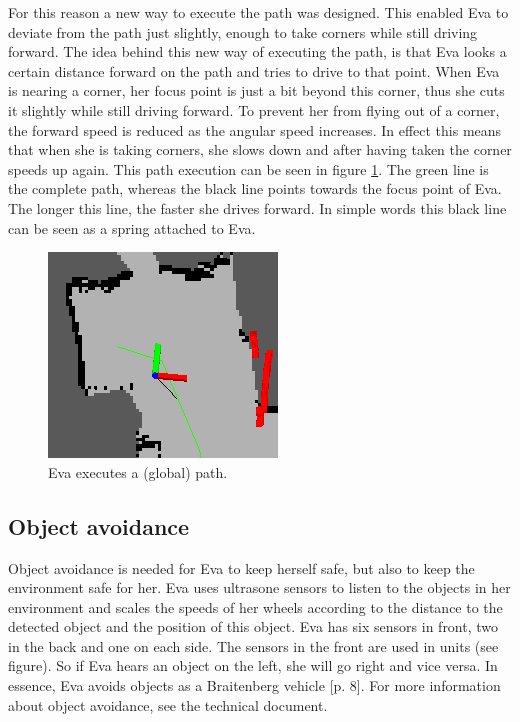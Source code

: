 \documentclass[project_eva.tex]{subfiles}
\begin{document}
For this reason a new way to execute the path was designed. This enabled Eva to deviate from the path just slightly, enough to take corners while still driving forward. The idea behind this new way of executing the path, is that Eva looks a certain distance forward on the path and tries to drive to that point. When Eva is nearing a corner, her focus point is just a bit beyond this corner, thus she cuts it slightly while still driving forward. To prevent her from flying out of a corner, the forward speed is reduced as the angular speed increases. In effect this means that when she is taking corners, she slows down and after having taken the corner speeds up again. This path execution can be seen in figure \ref{fig:global_path}. The green line is the complete path, whereas the black line points towards the focus point of Eva. The longer this line, the faster she drives forward. In simple words this black line can be seen as a spring attached to Eva.
\begin{figure}[ht!]
	\centering
	\mbox{\includegraphics[scale=0.4]{Images/global_path.png}}
	\caption{Eva executes a (global) path.}
	\label{fig:global_path}
\end{figure}

\subsection*{Object avoidance}
Object avoidance is needed for Eva to keep herself safe, but also to keep the environment safe for her. Eva uses ultrasone 
sensors to listen to the objects in her environment and scales the speeds of her wheels according to the distance to the 
detected object and the position of this object. Eva has six sensors in front, two in the back and one on each side. The sensors in the front are used in units (see figure). So if Eva hears an object on the left, she will go right and vice versa. In essence, Eva avoids objects as a Braitenberg vehicle 
\cite{braitenberg} [p. 8]. For more information about object avoidance, see the 
technical document.
\end{document}
